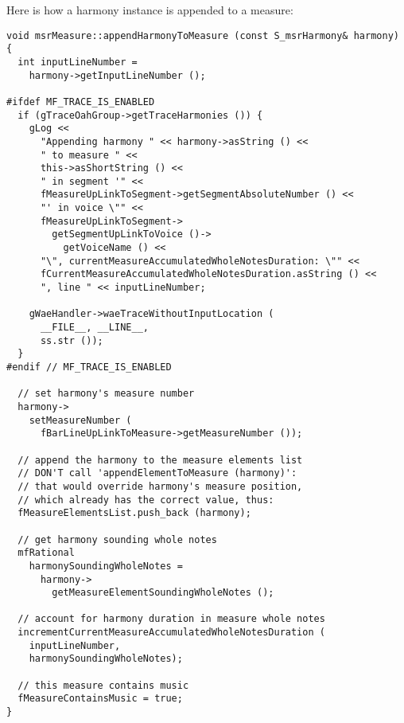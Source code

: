 Here is how a harmony instance is appended to a measure:
\begin{lstlisting}[language=CPlusPlus]
void msrMeasure::appendHarmonyToMeasure (const S_msrHarmony& harmony)
{
  int inputLineNumber =
    harmony->getInputLineNumber ();

#ifdef MF_TRACE_IS_ENABLED
  if (gTraceOahGroup->getTraceHarmonies ()) {
    gLog <<
      "Appending harmony " << harmony->asString () <<
      " to measure " <<
      this->asShortString () <<
      " in segment '" <<
      fMeasureUpLinkToSegment->getSegmentAbsoluteNumber () <<
      "' in voice \"" <<
      fMeasureUpLinkToSegment->
        getSegmentUpLinkToVoice ()->
          getVoiceName () <<
      "\", currentMeasureAccumulatedWholeNotesDuration: \"" <<
      fCurrentMeasureAccumulatedWholeNotesDuration.asString () <<
      ", line " << inputLineNumber;

    gWaeHandler->waeTraceWithoutInputLocation (
      __FILE__, __LINE__,
      ss.str ());
  }
#endif // MF_TRACE_IS_ENABLED

  // set harmony's measure number
  harmony->
    setMeasureNumber (
      fBarLineUpLinkToMeasure->getMeasureNumber ());

  // append the harmony to the measure elements list
  // DON'T call 'appendElementToMeasure (harmony)':
  // that would override harmony's measure position,
  // which already has the correct value, thus:
  fMeasureElementsList.push_back (harmony);

  // get harmony sounding whole notes
  mfRational
    harmonySoundingWholeNotes =
      harmony->
        getMeasureElementSoundingWholeNotes ();

  // account for harmony duration in measure whole notes
  incrementCurrentMeasureAccumulatedWholeNotesDuration (
    inputLineNumber,
    harmonySoundingWholeNotes);

  // this measure contains music
  fMeasureContainsMusic = true;
}
\end{lstlisting}

